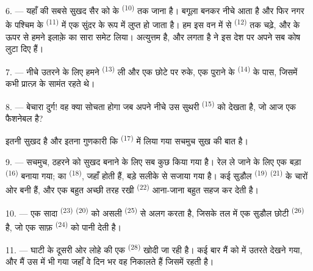 \VUsaut{3.0mm}
\VUsaut{3.0mm}

6. --- यहाँ की सबसे सुखद सैर को के  \textsuperscript{(10)} तक जाना
है।  बगूला बनकर नीचे आता है और फिर नगर के पश्चिम के
 \textsuperscript{(11)} में एक सुंदर  के रूप में
लुप्त हो जाता है। हम इस वन में से  \textsuperscript{(12)} तक
चढ़े, और  के ऊपर से हमने इलाक़े का सारा 
समेट लिया।  अत्युत्तम है, और लगता है 
ने इस देश पर अपने सब कोष लुटा दिए हैं।

7. --- नीचे उतरने के लिए हमने  \textsuperscript{(13)} ली और एक
छोटे  पर रुके, एक पुराने  के
 \textsuperscript{(14)} के पास, जिसमें कभी प्रात्ज़ के सामंत रहते
थे।

8. --- बेचारा दुर्ग! वह क्या सोचता होगा जब अपने नीचे उस सुथरी
 \textsuperscript{(15)} को देखता है, जो आज एक फैशनेबल
 है?

 इतनी सुखद है और  इतना गुणकारी कि
 \textsuperscript{(17)} में लिया गया  सचमुच
सुख की बात है।

\VUsaut{3.0mm}
\VUsaut{3.0mm}

9. --- सचमुच, ठहरने को सुखद बनाने के लिए सब कुछ किया गया है। रेल ले जाने के लिए
एक बड़ा  \textsuperscript{(16)} बनाया गया;  का
 \textsuperscript{(18)}, जहाँ  होती हैं, बड़े
सलीके से सजाया गया है। कई सुडौल  \textsuperscript{(19)}
 \textsuperscript{(21)} के चारों ओर बनी हैं, और एक बहुत अच्छी तरह रखी
 \textsuperscript{(22)} आना-जाना बहुत सहज कर देती है।

10. --- एक सादा  \textsuperscript{(23)} 
\textsuperscript{(20)} को असली  \textsuperscript{(25)} से अलग करता है,
जिसके तल में एक सुडौल छोटी  \textsuperscript{(26)} है, जो एक साफ़
 \textsuperscript{(24)} को पानी देती है।

11. --- घाटी के दूसरी ओर लोहे की एक  \textsuperscript{(28)} खोदी जा
रही है। कई बार मैं  को  में उतरते देखने गया, और मैं
उस  में भी गया जहाँ वे दिन भर वह  निकालते हैं
जिसमें  रहती है।

